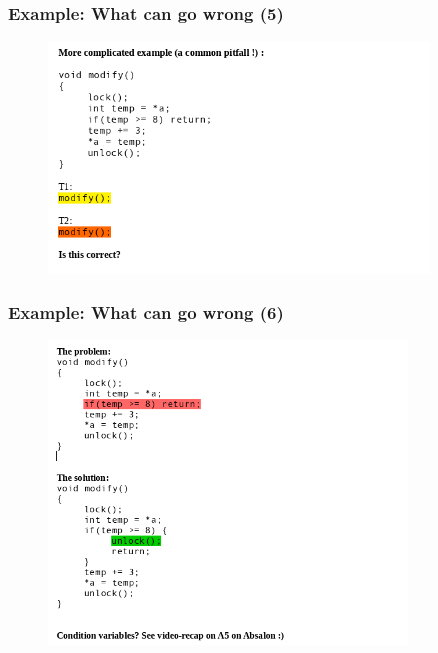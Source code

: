 \documentclass{beamer}
\begin{document}
\begin{frame}
\frametitle{Example: What can go wrong (5)}
\begin{figure}
\includegraphics[width=0.9\textwidth]{images/what-can-go-wrong-5.png}
\end{figure}
\end{frame}

\begin{frame}
\frametitle{Example: What can go wrong (6)}
\begin{figure}
\includegraphics[width=0.85\textwidth]{images/what-can-go-wrong-6.png}
\end{figure}
\end{frame}
\end{document}
